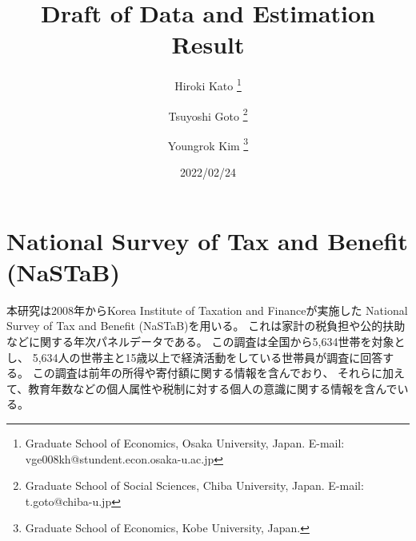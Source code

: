 \documentclass[
  11pt,
  a4paper,
]{article}
\title{Draft of Data and Estimation Result  }
\author{
    Hiroki Kato
  \thanks{Graduate School of Economics, Osaka University, Japan. E-mail: vge008kh@stundent.econ.osaka-u.ac.jp  }
  \and
    Tsuyoshi Goto
  \thanks{Graduate School of Social Sciences, Chiba University, Japan. E-mail: t.goto@chiba-u.jp  }
  \and
    Youngrok Kim
  \thanks{Graduate School of Economics, Kobe University, Japan.  }
  \and
  }
\date{2022/02/24}
\begin{document}
\begin{spacing}{1}
  \maketitle
\end{spacing}

\hypertarget{nastab}{%
\section{National Survey of Tax and Benefit (NaSTaB)}\label{nastab}}

本研究は2008年からKorea Institute of Taxation and Financeが実施した
National Survey of Tax and Benefit (NaSTaB)を用いる。
これは家計の税負担や公的扶助などに関する年次パネルデータである。
この調査は全国から5,634世帯を対象とし、
5,634人の世帯主と15歳以上で経済活動をしている世帯員が調査に回答する。
この調査は前年の所得や寄付額に関する情報を含んでおり、
それらに加えて、教育年数などの個人属性や税制に対する個人の意識に関する情報を含んでいる。
\end{document}
